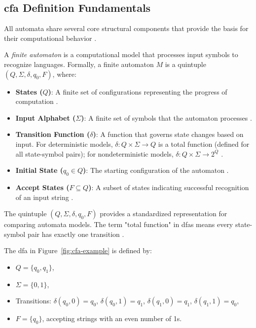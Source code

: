 \subsection{\acrshort{cfa} Definition Fundamentals}
\label{subsec:automata-definition-fundamentals}

All automata share several core structural components that provide the basis for their computational behavior \cite{hopcroft2006introduction, sipser2013introduction}.

\begin{definition}
\label{def:finite-automaton}
A \textit{finite automaton} is a computational model that processes input symbols to recognize languages. Formally, a finite automaton $M$ is a quintuple $(Q, \Sigma, \delta, q_0, F)$, where:
\begin{itemize}
    \item \textbf{States ($Q$)}: A finite set of configurations representing the progress of computation \cite{sipser2013introduction}.
    \item \textbf{Input Alphabet ($\Sigma$)}: A finite set of symbols that the automaton processes \cite{hopcroft2006introduction, sudkamp2006languages}.
    \item \textbf{Transition Function ($\delta$)}: A function that governs state changes based on input. For deterministic models, $\delta: Q \times \Sigma \to Q$ is a total function (defined for all state-symbol pairs); for nondeterministic models, $\delta: Q \times \Sigma \to 2^Q$ \cite{sipser2013introduction}.
    \item \textbf{Initial State ($q_0 \in Q$)}: The starting configuration of the automaton \cite{hopcroft2006introduction}.
    \item \textbf{Accept States ($F \subseteq Q$)}: A subset of states indicating successful recognition of an input string \cite{sipser2013introduction}.
\end{itemize}
\end{definition}

\begin{remark}
The quintuple $(Q, \Sigma, \delta, q_0, F)$ provides a standardized representation for comparing automata models. The term "total function" in \glspl{dfa} means every state-symbol pair has exactly one transition \cite{sipser2013introduction}.
\end{remark}

\begin{example}
The \gls{dfa} in Figure~\ref{fig:cfa-example} is defined by:
\begin{itemize}
    \item $Q = \{q_0, q_1\}$,
    \item $\Sigma = \{0, 1\}$,
    \item Transitions: $\delta(q_0, 0) = q_0$, $\delta(q_0, 1) = q_1$, $\delta(q_1, 0) = q_1$, $\delta(q_1, 1) = q_0$,
    \item $F = \{q_0\}$, accepting strings with an even number of 1s.
\end{itemize}
\end{example}

